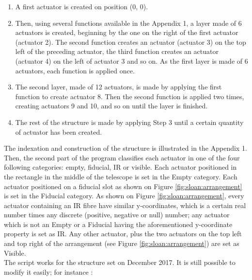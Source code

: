 \begin{enumerate}
	\item A first actuator is created on position (0, 0).
	\item Then, using several functions available in the Appendix 1, a layer made of 6 actuators is created, beginning by the one on the right of the first actuator (actuator 2). The second function creates an actuator (actuator 3) on the top left of the preceding actuator, the third function creates an actuator (actuator 4) on the left of actuator 3 and so on. As the first layer is made of 6 actuators, each function is applied once.
	\item The second layer, made of 12 actuators, is made by applying the first function to create actuator 8. Then the second function is applied two times, creating actuators 9 and 10, and so on until the layer is finished.
	\item The rest of the structure is made by applying Step 3 until a certain quantity of actuator has been created.
\end{enumerate} 

The indexation and construction of the structure is illustrated in the Appendix 1.
\\

 Then, the second part of the program classifies each actuator in one of the four following categories: empty, fiducial, IR or visible. Each actuator positioned in the rectangle in the middle of the telescope is set in the Empty category. Each actuator positioned on a fiducial slot as shown on Figure \ref{fig:sloan:arrangement} is set in the Fiducial category. As shown on Figure \ref{fig:sloan:arrangement}, every actuator containing an IR fibre have similar y-coordinates, which is a certain real number times any discrete (positive, negative or null) number; any actuator which is not an Empty or a Fiducial having the aforementioned y-coordinate property is set as IR. Any other actuator, plus the two actuators on the top left and top right of the arrangement (see Figure \ref{fig:sloan:arrangement}) are set as Visible.
\\

The script works for the structure set on December 2017. It is still possible to modify it easily; for instance :

